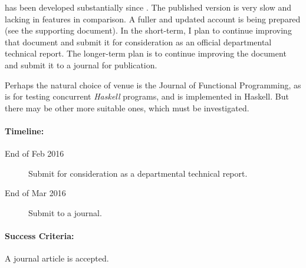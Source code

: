 \dejafu{} has been developed substantially since \citep{dejafu}. The
published version is very slow and lacking in features in
comparison. A fuller and updated account is being prepared (see the
supporting document). In the short-term, I plan to continue improving
that document and submit it for consideration as an official
departmental technical report. The longer-term plan is to continue
improving the document and submit it to a journal for publication.

Perhaps the natural choice of venue is the Journal of Functional
Programming, as \dejafu{} is for testing concurrent \emph{Haskell}
programs, and is implemented in Haskell. But there may be other more
suitable ones, which must be investigated.

\paragraph{Timeline:}

\begin{description}
\item[End of Feb 2016] Submit for consideration as a departmental
  technical report.

\item[End of Mar 2016] Submit to a journal.
\end{description}

\paragraph{Success Criteria:}

A journal article is accepted.
